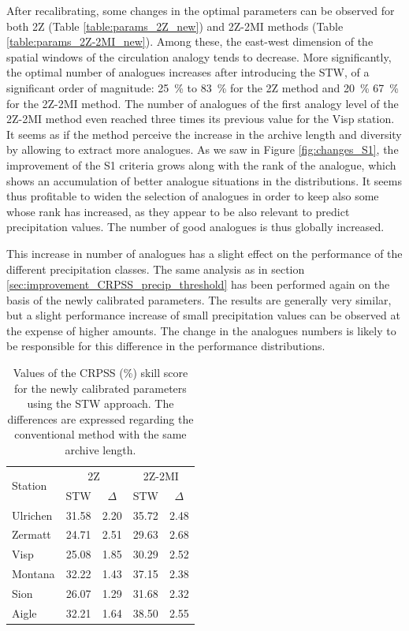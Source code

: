 \documentclass[hess]{copernicus}
\begin{document}
After recalibrating, some changes in the optimal parameters can be observed for both 2Z (Table \ref{table:params_2Z_new}) and 2Z-2MI methods (Table \ref{table:params_2Z-2MI_new}). Among these, the east-west dimension of the spatial windows of the circulation analogy tends to decrease. More significantly, the optimal number of analogues increases after introducing the STW, of a significant order of magnitude: 25~\% to 83~\% for the 2Z method and 20~\% 67~\% for the 2Z-2MI method. The number of analogues of the first analogy level of the 2Z-2MI method even reached three times its previous value for the Visp station. It seems as if the method perceive the increase in the archive length and diversity by allowing to extract more analogues. As we saw in Figure \ref{fig:changes_S1}, the improvement of the S1 criteria grows along with the rank of the analogue, which shows an accumulation of better analogue situations in the distributions. It seems thus profitable to widen the selection of analogues in order to keep also some whose rank has increased, as they appear to be also relevant to predict precipitation values. The number of good analogues is thus globally increased.

This increase in number of analogues has a slight effect on the performance of the different precipitation classes. The same analysis as in section \ref{sec:improvement_CRPSS_precip_threshold} has been performed again on the basis of the newly calibrated parameters. The results are generally very similar, but a slight performance increase of small precipitation values can be observed at the expense of higher amounts. The change in the analogues numbers is likely to be responsible for this difference in the performance distributions.

\begin{table}[htb]
	\caption{Values of the CRPSS (\%) skill score for the newly calibrated parameters using the STW approach. The differences are expressed regarding the conventional method with the same archive length.}
	\begin{center}
		\begin{tabular}{l c c c c}
			\hline
			\multirow{2}{*}{Station} & \multicolumn{2}{c}{2Z} & \multicolumn{ 2}{c}{2Z-2MI} \\
			& STW & $\Delta$ & STW & $\Delta$ \\
			\hline
			Ulrichen & 31.58 & 2.20 & 35.72 & 2.48  \\
			Zermatt & 24.71 & 2.51 & 29.63 & 2.68 \\
			Visp & 25.08 & 1.85 & 30.29 & 2.52 \\
			Montana & 32.22 & 1.43 & 37.15 & 2.38 \\
			Sion & 26.07 & 1.29 & 31.68 & 2.32 \\
			Aigle & 32.21 & 1.64 & 38.50 & 2.55 \\
			\hline
		\end{tabular}
	\end{center}
	\label{table:CRPSS_recalibration}
\end{table}
\end{document}
